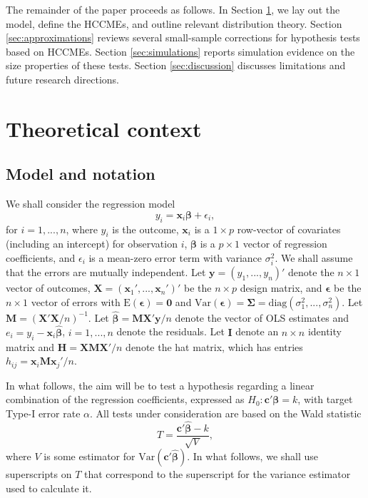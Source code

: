 \documentclass[12pt]{article}\usepackage[]{graphicx}\usepackage[]{color}
\newcommand{\E}{\text{E}}
\newcommand{\Var}{\text{Var}}
\newcommand{\diag}{\text{diag}}
\newcommand{\bm}{\mathbf}
\newcommand{\bs}{\boldsymbol}
\begin{document}
The remainder of the paper proceeds as follows. In Section \ref{sec:context}, we lay out the model, define the HCCMEs, and outline relevant distribution theory. Section \ref{sec:approximations} reviews several small-sample corrections for hypothesis tests based on HCCMEs. Section \ref{sec:simulations} reports simulation evidence on the size properties of these tests. Section \ref{sec:discussion} discusses limitations and future research directions.

\section{Theoretical context}
\label{sec:context}

\subsection{Model and notation}
\label{subsec:model}

We shall consider the regression model
\begin{equation}
\label{eq:regression_model}
y_i = \bm{x}_i\bs\beta + \epsilon_i,
\end{equation}
for $i = 1,...,n$, where $y_i$ is the outcome, $\bm{x}_i$ is a $1 \times p$ row-vector of covariates (including an intercept) for observation $i$, $\bs\beta$ is a $p \times 1$ vector of regression coefficients, and $\epsilon_i$ is a mean-zero error term with variance $\sigma_i^2$. 
We shall assume that the errors are mutually independent. 
Let $\bm{y} = \left(y_1,...,y_n\right)'$ denote the $n \times 1$ vector of outcomes, $\bm{X} = \left(\bm{x}_1',...,\bm{x}_n'\right)'$ be the $n \times p$ design matrix, and $\bs\epsilon$ be the $n \times 1$ vector of errors with $\E\left(\bs\epsilon\right) = \bm{0}$ and $\Var\left(\bs\epsilon\right) = \bs\Sigma = \diag\left(\sigma_1^2,...,\sigma_n^2\right)$. 
Let $\bm{M} = \left(\bm{X}'\bm{X} / n\right)^{-1}$. 
Let $\bs{\hat\beta} = \bm{M}\bm{X}'\bm{y} / n$ denote the vector of OLS estimates and $e_i = y_i - \bm{x}_i \bs{\hat\beta}$, $i = 1,...,n$ denote the residuals. 
Let $\bm{I}$ denote an $n \times n$ identity matrix and $\bm{H} = \bm{X}\bm{M}\bm{X}' / n$ denote the hat matrix, which has entries $h_{ij} = \bm{x}_i \bm{M}\bm{x}_j' / n$.

In what follows, the aim will be to test a hypothesis regarding a linear combination of the regression coefficients, expressed as $H_0: \bm{c}'\bs\beta = k$, with target Type-I error rate $\alpha$. 
All tests under consideration are based on the Wald statistic
\begin{equation}
T = \frac{\bm{c}'\bs{\hat\beta} - k}{\sqrt{V}},
\end{equation}
where $V$ is some estimator for $\Var\left(\bm{c}'\bs{\hat\beta}\right)$. In what follows, we shall use superscripts on $T$ that correspond to the superscript for the variance estimator used to calculate it.
\end{document}
